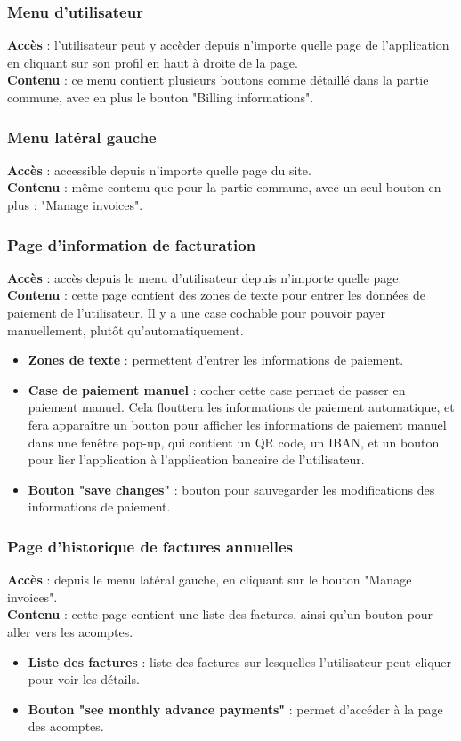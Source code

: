 \documentclass[../rapport.tex]{subfiles}
\begin{document}
\subsubsection{Menu d'utilisateur}
\noindent \textbf{Accès} : l'utilisateur peut y accèder depuis n'importe quelle page de l'application en cliquant sur son profil en haut à droite de la page. \\
\textbf{Contenu} : ce menu contient plusieurs boutons comme détaillé dans la partie commune, avec en plus le bouton "Billing informations". 

\subsubsection{Menu latéral gauche}
\noindent \textbf{Accès} : accessible depuis n'importe quelle page du site. \\
\textbf{Contenu} : même contenu que pour la partie commune, avec un seul bouton en plus : "Manage invoices".

\subsubsection{Page d'information de facturation}
\noindent \textbf{Accès} : accès depuis le menu d'utilisateur depuis n'importe quelle page. \\
\textbf{Contenu} : cette page contient des zones de texte pour entrer les données de paiement de l'utilisateur. Il y a une case cochable pour pouvoir payer manuellement, plutôt qu'automatiquement. 
\begin{itemize}
    \item \textbf{Zones de texte} : permettent d'entrer les informations de paiement.
    \item \textbf{Case de paiement manuel} : cocher cette case permet de passer en paiement manuel. Cela flouttera les informations de paiement automatique, et fera apparaître un bouton pour afficher les informations de paiement manuel dans une fenêtre pop-up, qui contient un QR code, un IBAN, et un bouton pour lier l'application à l'application bancaire de l'utilisateur.
    \item \textbf{Bouton "save changes"} : bouton pour sauvegarder les modifications des informations de paiement.
\end{itemize}

\subsubsection{Page d'historique de factures annuelles}
\noindent \textbf{Accès} : depuis le menu latéral gauche, en cliquant sur le bouton "Manage invoices".\\
\textbf{Contenu} : cette page contient une liste des factures, ainsi qu'un bouton pour aller vers les acomptes.
\begin{itemize}
    \item \textbf{Liste des factures} : liste des factures sur lesquelles l'utilisateur peut cliquer pour voir les détails.
    \item \textbf{Bouton "see monthly advance payments"} : permet d'accéder à la page des acomptes.
\end{itemize}
\end{document}
